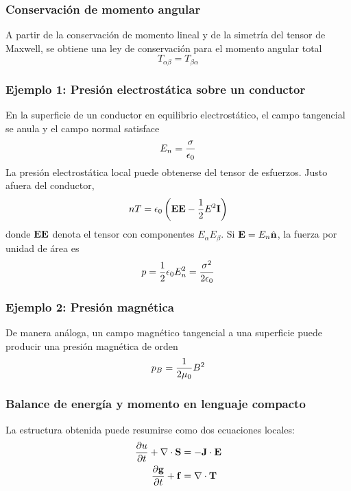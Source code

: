 \documentclass[]{article}
\numberwithin{equation}{section}
\begin{document}
\subsubsection{Conservación de momento angular}
A partir de la conservación de momento lineal y de la simetría del tensor de Maxwell, se obtiene una ley de conservación para el momento angular total
\begin{equation}
	T_{\alpha\beta} = T_{\beta\alpha}
\end{equation}

\subsubsection{Ejemplo 1: Presión electrostática sobre un conductor}
En la superficie de un conductor en equilibrio electrostático, el campo tangencial se anula y el campo normal satisface
\begin{equation*}
	E_{n} = \frac{\sigma}{\epsilon_{0}}
\end{equation*}
La presión electrostática local puede obtenerse del tensor de esfuerzos. Justo afuera del conductor,
\begin{equation*}
	n{T} = \epsilon_{0}\left(\mathbf{EE} - \frac{1}{2}E^2 \mathbf{I}\right)
\end{equation*}
donde \(\mathbf{EE}\) denota el tensor con componentes \(E_{\alpha} E_{\beta}\). Si \(\mathbf{E} = E_{n} \hat{\mathbf{n}}\), la fuerza por unidad de área es
\begin{equation*}
	p = \frac{1}{2} \epsilon_{0} E_{n}^{2} = \frac{\sigma^2}{2\epsilon_{0}}
\end{equation*}

\subsubsection{Ejemplo 2: Presión magnética}
De manera análoga, un campo magnético tangencial a una superficie puede producir una presión magnética de orden
\begin{equation*}
	p_{B} = \frac{1}{2\mu_{0}}B^2
\end{equation*}

\subsubsection{Balance de energía y momento en lenguaje compacto}
La estructura obtenida puede resumirse como dos ecuaciones locales:
\begin{align*}
	\dfrac{\partial u}{\partial t} + \nabla\cdot\mathbf{S} &= -\mathbf{J}\cdot\mathbf{E}\\
	\dfrac{\partial \mathbf{g}}{\partial t} + \mathbf{f} &= \nabla\cdot\mathbf{T}
\end{align*}
\end{document}

